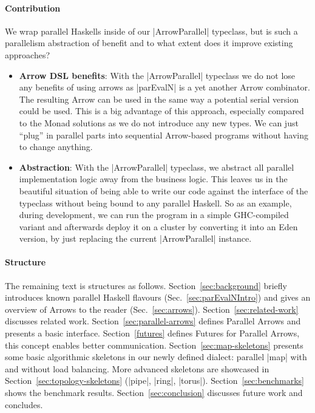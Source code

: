 \paragraph{Contribution}
%
%
We wrap parallel Haskells inside of our |ArrowParallel| typeclass, but
 is such a parallelism abstraction of benefit and to what extent does
 it improve existing approaches?
\begin{itemize}
	\item \textbf{Arrow DSL benefits}:
	With the |ArrowParallel| typeclass we do not lose any benefits of using arrows as |parEvalN| is a yet another Arrow combinator. The resulting Arrow can be used in the same way a potential serial version could be used. This is a big advantage of this approach, especially compared to the Monad solutions as we do not introduce any new types. We can just \enquote{plug} in parallel parts into sequential Arrow-based programs without having to change anything.
	\item \textbf{Abstraction}:
	With the |ArrowParallel| typeclass, we abstract all parallel implementation logic away from the business logic. This leaves us in the beautiful situation of being able to write our code against the interface of the typeclass without being bound to any parallel Haskell. So as an example, during development, we can run the program in a simple GHC-compiled variant and afterwards deploy it on a cluster by converting it into an Eden version, by just replacing the current |ArrowParallel| instance.
\end{itemize}


\paragraph{Structure}
The remaining text is structures as follows. Section~\ref{sec:background} briefly introduces known parallel Haskell flavours (Sec.~\ref{sec:parEvalNIntro}) and gives an overview of Arrows to the reader (Sec.~\ref{sec:arrows}). Section~\ref{sec:related-work} discusses related work. Section~\ref{sec:parallel-arrows} defines Parallel Arrows and presents a basic interface. Section~\ref{futures} defines Futures for Parallel Arrows, this concept enables better communication. Section~\ref{sec:map-skeletons} presents some basic algorithmic skeletons  in our newly defined dialect: parallel |map| with and without load balancing. More advanced skeletons are showcased in Section~\ref{sec:topology-skeletons} (|pipe|, |ring|, |torus|). Section~\ref{sec:benchmarks} shows the benchmark results. Section~\ref{sec:conclusion} discusses future work and concludes.

